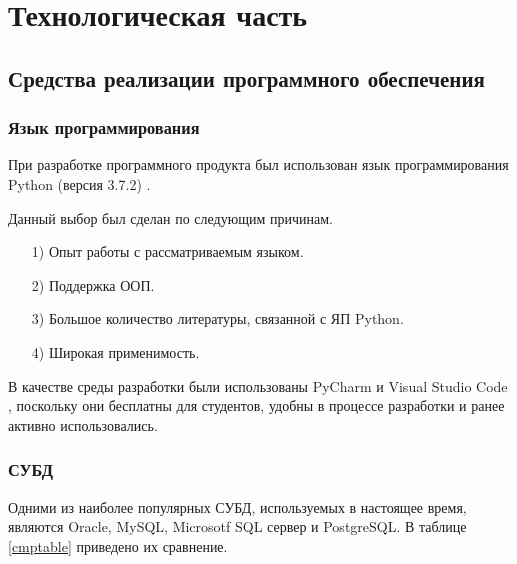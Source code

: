 \section{Технологическая часть}
	\subsection{Средства реализации программного обеспечения}
		\subsubsection{Язык программирования}
			При разработке программного продукта был использован язык программирования Python (версия 3.7.2) \cite{python}.
			
			Данный выбор был сделан по следующим причинам.
			\begin{enumerate}
				\item[1)] Опыт работы с рассматриваемым языком.
				\item[2)] Поддержка ООП.
				\item[3)] Большое количество литературы, связанной с ЯП Python.
				\item[4)] Широкая применимость.
			\end{enumerate}
		
			В качестве среды разработки были использованы PyCharm \cite{pycharm} и Visual Studio Code \cite{vcode}, поскольку они бесплатны для студентов, удобны в процессе разработки и ранее активно использовались.

		\subsubsection{СУБД}
		Одними из наиболее популярных СУБД, используемых в настоящее время, являются Oracle, MySQL, Microsotf SQL сервер и PostgreSQL. В таблице \ref{cmptable} приведено их сравнение.
		

